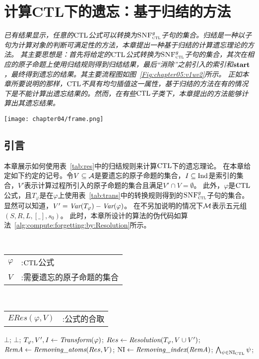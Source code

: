 \chapter{计算CTL下的遗忘：基于归结的方法}\label{chapter04}
{\em 
已有结果显示，任意的$\textrm{CTL}$公式可以转换为${\textsc{SNF}_{\textsc{ctl}}^g}$子句的集合。归结是一种以子句为计算对象的判断可满足性的方法，本章提出一种基于归结的计算遗忘理论的方法。
其主要思想是：首先将给定的$\textrm{CTL}$公式转换为${\textsc{SNF}_{\textsc{ctl}}^g}$子句的集合，其次在相应的原子命题上使用归结规则得到归结结果，最后“消除”之前引入的索引和$\textbf{start}$，最终得到遗忘的结果。其主要流程图如图~\ref{Fig:chapter05:v1uv2}所示。
正如本章所要说明的那样，$\textrm{CTL}$不具有均匀插值这一属性，基于归结的方法在有的情况下是不能计算出遗忘结果的。然而，在有些$\textrm{CTL}$子类下，本章提出的方法能够计算出其遗忘结果。}
\begin{figure*}[!htb]
	\centering
	\texttt{[image: chapter04/frame.png]}\\
	\caption{基于归结的遗忘的主要流程图}
	\label{Fig:chapter05:v1uv2}
\end{figure*}

\section{引言}
本章展示如何使用表~\ref{tab:res}中的归结规则来计算$\textrm{CTL}$下的遗忘理论。
在本章给定如下约定的记号。令$V\subseteq {\cal A}$是要遗忘的原子命题的集合，$I\subseteq \textrm{Ind}$是索引的集合，$V'$表示计算过程所引入的原子命题的集合且满足$V'\cap V=\emptyset$。
此外，$\varphi$是$\textrm{CTL}$公式，且$T_{\varphi}$是在$\varphi$上使用表~\ref{tab:trans}中的转换规则得到的${\textsc{SNF}_{\textsc{ctl}}^g}$子句的集合。
显然可以知道，$V'=\textit{Var}(T_{\varphi})-\textit{Var}(\varphi)$。
在不另加说明的情况下${\cal M}$表示五元组$(S,R,L,[\_],s_0)$。
此时，本章所设计的算法的伪代码如算法~\ref{alg:compute:forgetting:by:Resolution}所示。

\begin{algorithm}[htbp]
	\small
	\caption{\emph{ERes}$(\varphi, V)$}
	\label{alg:compute:forgetting:by:Resolution}
	\begin{algorithmic}[1]
		\REQUIRE ~~\\
		\begin{tabular}[t]{p{8mm}l}
			$\varphi$&:$\textrm{CTL}$公式\\
			$V$&:需要遗忘的原子命题的集合
		\end{tabular}
		\ENSURE ~~\\
		\begin{tabular}[t]{p{8mm}l}
			$ERes(\varphi, V)$&\qquad:公式的合取
		\end{tabular}
		\RETURN $\bot$;
		\ENDIF
		\RETURN $\bot$;
		\ENDIF
		\STATE $T_{\varphi}, V', I \leftarrow \emph{Transform}(\varphi)$;
		\STATE $Res \leftarrow \emph{Resolution}(T_{\varphi}, V\cup V')$;
		\STATE $\emph{RemA} \leftarrow \emph{Removing\_atoms}(Res, V)$;
		\STATE $\textrm{NI} \leftarrow \emph{Removing\_index}(\emph{RemA})$;
		\RETURN $\bigwedge_{\psi \in \textrm{NI}_{\textrm{CTL}}} \psi$;
	\end{algorithmic}
\end{algorithm}


